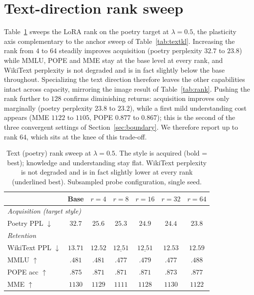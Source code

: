 \section{Text-direction rank sweep}
\label{app:textsweep}
Table~\ref{tab:textrank} sweeps the LoRA rank on the poetry target at
$\lambda{=}0.5$, the plasticity axis complementary to the anchor sweep of
Table~\ref{tab:textkl}. Increasing the rank from $4$ to $64$ steadily improves
acquisition (poetry perplexity $32.7$ to $23.8$) while MMLU, POPE and MME stay at
the base level at every rank, and WikiText perplexity is not degraded and is in
fact slightly below the base throughout. Specializing the text direction
therefore leaves the other capabilities intact across capacity, mirroring the
image result of Table~\ref{tab:rank}. Pushing the rank further to $128$ confirms
diminishing returns: acquisition improves only marginally (poetry perplexity
$23.8$ to $23.2$), while a first mild understanding cost appears (MME $1122$ to
$1105$, POPE $0.877$ to $0.867$); this is the second of the three convergent
settings of Section~\ref{sec:boundary}. We therefore report up to rank $64$,
which sits at the knee of this trade-off.

\begin{table}[t]
\centering\small
\setlength{\tabcolsep}{7pt}
\begin{tabular}{lcccccc}
\toprule
& Base & $r{=}4$ & $r{=}8$ & $r{=}16$ & $r{=}32$ & $r{=}64$ \\
\midrule
\multicolumn{7}{l}{\textit{Acquisition (target style)}}\\
Poetry PPL $\downarrow$ & $32.7$ & $25.6$ & $25.3$ & $24.9$ & $24.4$ & $\mathbf{23.8}$ \\
\midrule
\multicolumn{7}{l}{\textit{Retention}}\\
WikiText PPL $\downarrow$ & $13.71$ & $12.52$ & $\underline{12.51}$ & $\underline{12.51}$ & $12.53$ & $12.59$ \\
MMLU $\uparrow$           & $.481$ & $.481$ & $.477$ & $.479$ & $.477$ & $.488$ \\
POPE acc $\uparrow$       & $.875$ & $.871$ & $.871$ & $.871$ & $.873$ & $.877$ \\
MME $\uparrow$            & $1130$ & $1129$ & $1111$ & $1128$ & $1130$ & $1122$ \\
\bottomrule
\end{tabular}
\caption{Text (poetry) rank sweep at $\lambda{=}0.5$. The style is acquired (bold
= best); knowledge and understanding stay flat. WikiText perplexity is not
degraded and is in fact slightly lower at every rank (underlined best).
Subsampled probe configuration, single seed.}
\label{tab:textrank}
\end{table}


